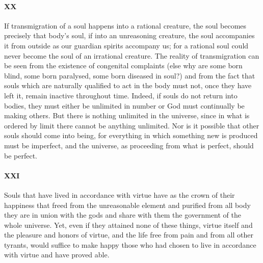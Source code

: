 \documentclass[12pt]{article}
\begin{document}
\paragraph{XX} If transmigration of a soul happens into a rational creature,
the soul becomes precisely that body's soul, if into an unreasoning creature,
the soul accompanies it from outside as our guardian spirits accompany us; for
a rational soul could never become the soul of an irrational creature. The
reality of transmigration can be seen from the existence of congenital
complaints (else why are some born blind, some born paralysed, some born
diseased in soul?) and from the fact that souls which are naturally qualified
to act in the body must not, once they have left it, remain inactive throughout
time. Indeed, if souls do not return into bodies, they must either be unlimited
in number or God must continually be making others. But there is nothing
unlimited in the universe, since in what is ordered by limit there cannot be
anything unlimited. Nor is it possible that other souls should come into being,
for everything in which something new is produced must be imperfect, and the
universe, as proceeding from what is perfect, should be perfect.

\paragraph{XXI} Souls that have lived in accordance with virtue have as the
crown of their happiness that freed from the unreasonable element and purified
from all body they are in union with the gods and share with them the
government of the whole universe. Yet, even if they attained none of these
things, virtue itself and the pleasure and honors of virtue, and the life free
from pain and from all other tyrants, would suffice to make happy those who had
chosen to live in accordance with virtue and have proved able.
\end{document}
